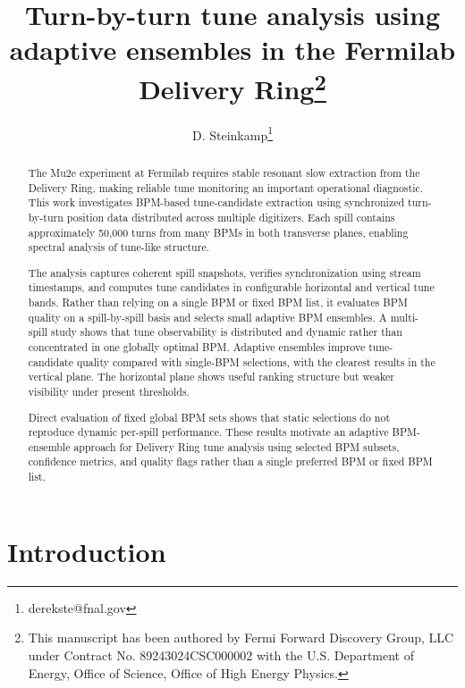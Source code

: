 \documentclass[]{jacow}
\begin{document}
\title{Turn-by-turn tune analysis using adaptive  ensembles in the Fermilab  Delivery Ring\thanks{This manuscript has been authored by Fermi Forward Discovery Group, LLC under Contract No. 89243024CSC000002 with the U.S. Department of Energy, Office of Science, Office of High Energy Physics.}}

\author[1]{D. Steinkamp\thanks{derekste@fnal.gov}}

\maketitle

\begin{abstract}
The Mu2e experiment at Fermilab requires stable resonant slow extraction from the Delivery Ring, making reliable tune monitoring an important operational diagnostic. This work investigates BPM-based tune-candidate extraction using synchronized turn-by-turn position data distributed across multiple digitizers. Each spill contains approximately 50,000 turns from many BPMs in both transverse planes, enabling spectral analysis of tune-like structure.

The analysis captures coherent spill snapshots, verifies synchronization using stream timestamps, and computes tune candidates in configurable horizontal and vertical tune bands. Rather than relying on a single BPM or fixed BPM list, it evaluates BPM quality on a spill-by-spill basis and selects small adaptive BPM ensembles. A multi-spill study shows that tune observability is distributed and dynamic rather than concentrated in one globally optimal BPM. Adaptive ensembles improve tune-candidate quality compared with single-BPM selections, with the clearest results in the vertical plane. The horizontal plane shows useful ranking structure but weaker visibility under present thresholds.

Direct evaluation of fixed global BPM sets shows that static selections do not reproduce dynamic per-spill performance. These results motivate an adaptive BPM-ensemble approach for Delivery Ring tune analysis using selected BPM subsets, confidence metrics, and quality flags rather than a single preferred BPM or fixed BPM list.
\end{abstract}

\section{Introduction}
\end{document}
